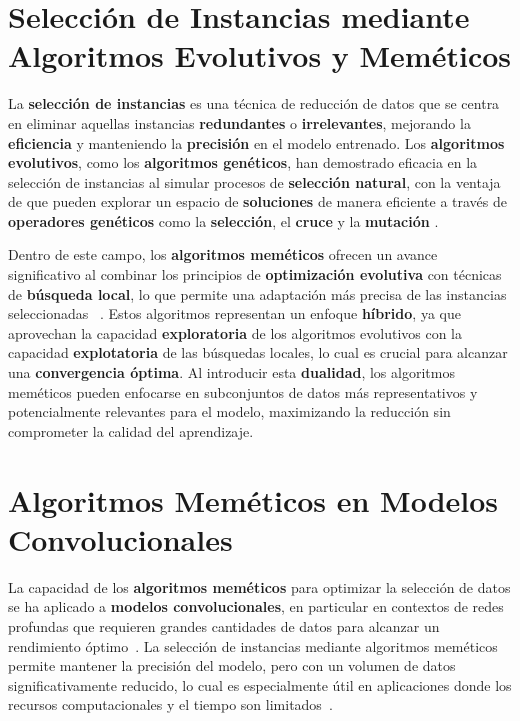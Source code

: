\section{Selección de Instancias mediante Algoritmos Evolutivos y Meméticos}
\label{sec:seleccion-de-instancias-mediante-algoritmos-evolutivos-y-memeticos}
La \textbf{selección de instancias} es una técnica de reducción de datos que se centra en eliminar aquellas instancias
\textbf{redundantes} o \textbf{irrelevantes}, mejorando la \textbf{eficiencia} y manteniendo la \textbf{precisión} en
el modelo entrenado.
Los \textbf{algoritmos evolutivos}, como los \textbf{algoritmos genéticos}, han demostrado eficacia en la selección de
instancias al simular procesos de \textbf{selección natural}, con la ventaja de que pueden explorar un espacio de
\textbf{soluciones} de manera eficiente a través de \textbf{operadores genéticos} como la \textbf{selección}, el
\textbf{cruce} y la \textbf{mutación} \cite{Holland, 1975}.


Dentro de este campo, los \textbf{algoritmos meméticos} ofrecen un avance significativo al combinar los principios de
\textbf{optimización evolutiva} con técnicas de \textbf{búsqueda local}, lo que permite una adaptación más precisa de
las instancias seleccionadas
~\cite{On Evolution, Search, Optimization, Genetic Algorithms and Martial Arts - Towards Memetic Algorithms}.
Estos algoritmos representan un enfoque \textbf{híbrido}, ya que aprovechan la capacidad \textbf{exploratoria} de los
algoritmos evolutivos con la capacidad \textbf{explotatoria} de las búsquedas locales, lo cual es crucial para alcanzar
una \textbf{convergencia óptima}.
Al introducir esta \textbf{dualidad}, los algoritmos meméticos pueden enfocarse en subconjuntos de datos más
representativos y potencialmente relevantes para el modelo, maximizando la reducción sin comprometer la calidad del
aprendizaje.


\section{Algoritmos Meméticos en Modelos Convolucionales}\label{sec:algoritmos-memeticos-en-modelos-convolucionales}
La capacidad de los \textbf{algoritmos meméticos} para optimizar la selección de datos se ha aplicado a
\textbf{modelos convolucionales}, en particular en contextos de redes profundas que requieren grandes cantidades de
datos para alcanzar un rendimiento óptimo~\cite{He et al., 2016}.
La selección de instancias mediante algoritmos meméticos permite mantener la precisión del modelo, pero con un volumen
de datos significativamente reducido, lo cual es especialmente útil en aplicaciones donde los recursos computacionales
y el tiempo son
limitados~\cite{A Memetic Algorithm for Evolving Deep Convolutional Neural Network in Image Classification}.



